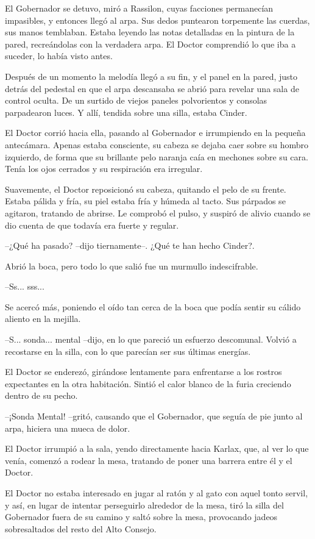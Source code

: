 El Gobernador se detuvo, miró a Rassilon, cuyas facciones permanecían impasibles, y entonces llegó al arpa. Sus dedos puntearon torpemente las cuerdas, sus manos temblaban. Estaba leyendo las notas detalladas en la pintura de la pared, recreándolas con la verdadera arpa. El Doctor comprendió lo que iba a suceder, lo había visto antes.

Después de un momento la melodía llegó a su fin, y el panel en la pared, justo detrás del pedestal en que el arpa descansaba se abrió para revelar una sala de control oculta. De un surtido de viejos paneles polvorientos y consolas parpadearon luces. Y allí, tendida sobre una silla, estaba Cinder.

El Doctor corrió hacia ella, pasando al Gobernador e irrumpiendo en la pequeña antecámara. Apenas estaba consciente, su cabeza se dejaba caer sobre su hombro izquierdo, de forma que su brillante pelo naranja caía en mechones sobre su cara. Tenía los ojos cerrados y su respiración era irregular.

Suavemente, el Doctor reposicionó su cabeza, quitando el pelo de su frente. Estaba pálida y fría, su piel estaba fría y húmeda al tacto. Sus párpados se agitaron, tratando de abrirse. Le comprobó el pulso, y suspiró de alivio cuando se dio cuenta de que todavía era fuerte y regular.

--¿Qué ha pasado? --dijo tiernamente--. ¿Qué te han hecho Cinder?.

Abrió la boca, pero todo lo que salió fue un murmullo indescifrable. 

--Ss... sss...

Se acercó más, poniendo el oído tan cerca de la boca que podía sentir su cálido aliento en la mejilla.

--S... sonda... mental --dijo, en lo que pareció un esfuerzo descomunal. Volvió a recostarse en la silla, con lo que parecían ser sus últimas energías.

El Doctor se enderezó, girándose lentamente para enfrentarse a los rostros expectantes en la otra habitación. Sintió el calor blanco de la furia creciendo dentro de su pecho. 

--¡Sonda Mental! --gritó, causando que el Gobernador, que seguía de pie junto al arpa, hiciera una mueca de dolor.

El Doctor irrumpió a la sala, yendo directamente hacia Karlax, que, al ver lo que venía, comenzó a rodear la mesa, tratando de poner una barrera entre él y el Doctor.

El Doctor no estaba interesado en jugar al ratón y al gato con aquel tonto servil, y así, en lugar de intentar perseguirlo alrededor de la mesa, tiró la silla del Gobernador fuera de su camino y saltó sobre la mesa, provocando jadeos sobresaltados del resto del Alto Consejo.


